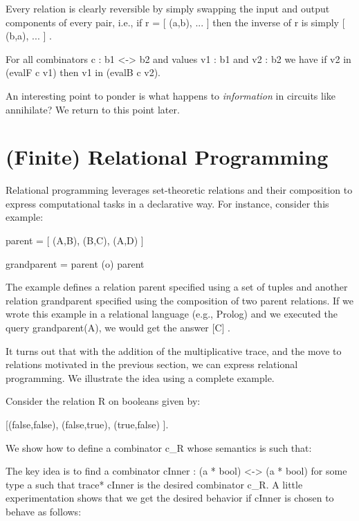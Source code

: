 \documentclass{llncs}
\begin{document}
Every relation is clearly reversible by simply swapping the input and
output components of every pair, i.e., if {{r = {[ (a,b), ... ]} }}
then the inverse of {{r}} is simply {{ {[ (b,a), ... ]} }}. 

\begin{proposition}
\label{prop:logrev-tracet}
For all combinators {{c : b1 <-> b2}} and values {{v1 : b1}} and 
{{v2 : b2}} we have if {{v2 in (evalF c v1)}} then 
{{v1 in (evalB c v2)}}.
\end{proposition}

An interesting point to ponder is what happens to \emph{information}
in circuits like {{annihilate}}? We return to this point later.

\section{(Finite) Relational Programming}
\label{ch3:sec:lp}

Relational programming leverages set-theoretic relations and their
composition to express computational tasks in a declarative way. For
instance, consider this example:

{{parent = {[ (A,B), (B,C), (A,D) ]} }}

{{grandparent = parent (o) parent}}

\noindent The example defines a relation {{parent}} specified using a
set of tuples and another relation {{grandparent}} specified using the
composition of two parent relations. If we wrote this example in a
relational language (e.g., Prolog) and we executed the query
{{grandparent(A)}}, we would get the answer {{ {[C]} }}.

It turns out that with the addition of the multiplicative trace, and
the move to relations motivated in the previous section, we can
express relational programming. We illustrate the idea using a
complete example. 

Consider the relation {{R}} on booleans given by:

{{ {[(false,false), (false,true), (true,false) ]}. }}

We show how to define a combinator {{c_R}} whose semantics is such that:


The key idea is to find a combinator {{cInner : (a * bool) <-> (a * bool)}}
for some type {{a}} such that {{trace* cInner}} is the desired combinator
{{c_R}}. A little experimentation shows that we get the desired behavior
if {{cInner}} is chosen to behave as follows:
\end{document}
